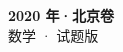 \documentclass[zihao=-4, a4paper]{ctexart}
\begin{document}
\begin{center}
  {\Large\bfseries 2020 年·北京卷}\\[4pt]
  {\large 数学 · 试题版}
\end{center}
\medskip
{}

\end{document}
